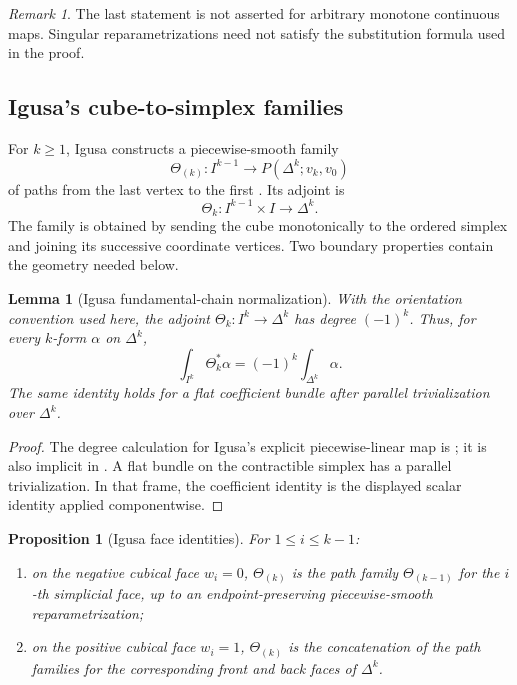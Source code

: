 \documentclass[12pt]{amsart}
\newtheorem{lem}[thm]{Lemma}
\newtheorem{prop}[thm]{Proposition}
\theoremstyle{definition}
\theoremstyle{remark}
\newtheorem{rem}[thm]{Remark}
\numberwithin{equation}{section}
\newcommand{\1}{{\mathbb{1}}}
\begin{document}
\begin{rem}
The last statement is not asserted for arbitrary monotone continuous
maps.  Singular reparametrizations need not satisfy the substitution
formula used in the proof.
\end{rem}

\subsection{Igusa's cube-to-simplex families}

For $k\geq1$, Igusa constructs a piecewise-smooth family
\[
 \Theta_{(k)}:
 I^{k-1}\longrightarrow P(\Delta^k;v_k,v_0)
\]
of paths from the last vertex to the first
\cite[Proposition 4.6]{Igu09}.  Its adjoint is
\[
 \Theta_k:I^{k-1}\times I\longrightarrow\Delta^k.
\]
The family is obtained by sending the cube monotonically to the ordered
simplex and joining its successive coordinate vertices.  Two boundary
properties contain the geometry needed below.

\begin{lem}[Igusa fundamental-chain normalization]
\label{lem:igusa-degree}
With the orientation convention used here, the adjoint
$\Theta_k:I^k\to\Delta^k$ has degree $(-1)^k$.  Thus, for every
$k$-form $\alpha$ on $\Delta^k$,
\[
 \int_{I^k}\Theta_k^*\alpha
 =
 (-1)^k\int_{\Delta^k}\alpha.
\]
The same identity holds for a flat coefficient bundle after parallel
trivialization over $\Delta^k$.
\end{lem}

\begin{proof}
The degree calculation for Igusa's explicit piecewise-linear map is
\cite[Remark 3.17(2)]{AS12}; it is also implicit in
\cite[Proposition 4.6]{Igu09}.  A flat bundle on the contractible
simplex has a parallel trivialization.  In that frame, the coefficient
identity is the displayed scalar identity applied componentwise.
\end{proof}

\begin{prop}[Igusa face identities]\label{prop:igusa-faces}
For $1\leq i\leq k-1$:
\begin{enumerate}
 \item on the negative cubical face $w_i=0$, $\Theta_{(k)}$ is
 the path family $\Theta_{(k-1)}$ for the $i$-th simplicial face,
 up to an endpoint-preserving piecewise-smooth reparametrization;
 \item on the positive cubical face $w_i=1$, $\Theta_{(k)}$ is the
 concatenation of the path families for the corresponding front and
 back faces of $\Delta^k$.
\end{enumerate}
\end{prop}
\end{document}
